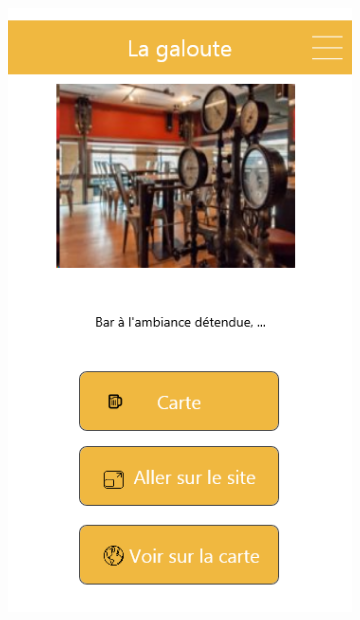 \documentclass{eplmastersthesis}
\begin{document}
\begin{figure}[H]
\begin{subfigure}[b]{0.3\textwidth}
        \includegraphics[width=\textwidth]{Images/InVision/detail-bar.png}
    \end{subfigure}
\end{figure}
\end{document}
